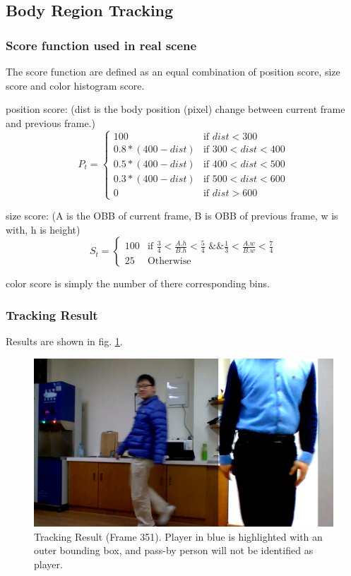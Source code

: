 \documentclass[11pt,twocolumn,letterpaper]{article}
\begin{document}
  \subsection{Body Region Tracking}
\subsubsection{Score function used in real scene}
The score function are defined as an equal combination of position score, size score and color histogram score.
\par
position score: (dist is the body position (pixel) change between current frame and previous frame.)
\begin{equation}
    P_{t}=
   \begin{cases}
   100 &\mbox{if $dist < 300$}\\
   0.8*(400-dist) &\mbox{if $300 < dist < 400$}\\
0.5*(400-dist) &\mbox{if $400 < dist < 500$}\\
0.3*(400-dist) &\mbox{if $500 < dist < 600$}\\
0 &\mbox{if $dist > 600$}
   \end{cases}
  \end{equation}

size score: (A is the OBB of current frame, B is OBB of previous frame, w is with, h is height)
\begin{equation}
    S_{t}=
   \begin{cases}
   100 &\mbox{if $\frac{3}{4} < \frac{A.h}{B.h} < \frac{5}{4} $ \&\& $\frac{1}{3} < \frac{A.w}{B.w} < \frac{7}{4} $}\\
25 &\mbox{Otherwise}
   \end{cases}
  \end{equation}

\par
color score is simply the number of there corresponding bins.

\subsubsection{Tracking Result}
Results are shown in fig. \ref{tracking}.
\begin{figure}[h]
      \centering
      \includegraphics[width=0.8\linewidth]{./Pic/tracking-351.png}
      \caption{Tracking Result (Frame 351). Player in blue is highlighted with an outer bounding box, and pass-by person will not be identified as player.}
	\label{tracking}      
\end{figure}
\end{document}
